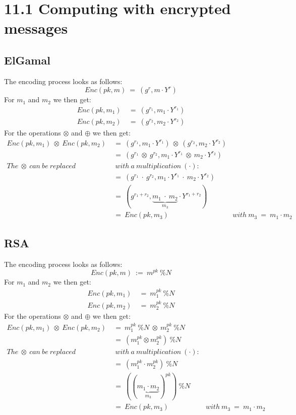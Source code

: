 \documentclass{report}
\begin{document}
	\pagestyle{fancy}
	
	\section*{11.1 Computing with encrypted messages}
	\subsection*{ElGamal}
	The encoding process looks as follows:
	\[
		Enc(pk, m) \ = \ (g^{r}, m \cdot Y^{r})
	\]
	For $m_1$ and $m_2$ we then get:
	\begin{align*}
		Enc(pk, m_1) \ & = \ (g^{r_1}, m_1 \cdot Y^{r_1}) \\
		Enc(pk, m_2) \ & = \ (g^{r_2}, m_2 \cdot Y^{r_2})
	\end{align*}
	For the operations $\otimes$ and $\oplus$ we then get:
	\begin{align*}
		Enc(pk, m_1) \ \otimes \ Enc(pk, m_2) \ & = \ (g^{r_1}, m_1 \cdot Y^{r_1}) \ \otimes \ (g^{r_2}, m_2 \cdot Y^{r_2}) \\
		& = \ (g^{r_1} \ \otimes \ g^{r_2}, m_1 \cdot Y^{r_1} \ \otimes \ m_2 \cdot Y^{r_2}) \\
		The \ \otimes \ can \ be \ replaced &\ with \ a \ multiplication \ (\cdot): \\
		& = \ (g^{r_1} \ \cdot \ g^{r_2}, m_1 \cdot Y^{r_1} \ \cdot \ m_2 \cdot Y^{r_2}) \\
		& = \ (g^{r_1 + r_2}, \underbrace{m_1 \ \cdot \ m_2}_{m_3} \cdot Y^{r_1 + r_2}) \\
		& = \ Enc(pk, m_3) & with \ m_3 \ = \ m_1 \cdot m_2
	\end{align*}
	\subsection*{RSA}
	The encoding process looks as follows:
	\[
		Enc(pk, m) \ := \ m^{pk} \ \% N
	\]
	For $m_1$ and $m_2$ we then get:
	\begin{align*}
		Enc(pk, m_1) \ & = \ m_1^{pk} \ \% N \\
		Enc(pk, m_2) \ & = \ m_2^{pk} \ \% N
	\end{align*}
	For the operations $\otimes$ and $\oplus$ we then get:
	\begin{align*}
		Enc(pk, m_1) \ \otimes \ Enc(pk, m_2) \ & = \ m_1^{pk} \ \% N \ \otimes \ m_2^{pk} \ \% N \\
		& = \ (m_1^{pk} \otimes m_2^{pk}) \ \% N \\
		The \ \otimes \ can \ be \ replaced &\ with \ a \ multiplication \ (\cdot): \\
		& = \ (m_1^{pk} \cdot m_2^{pk}) \ \% N \\
		& = \ ((\underbrace{m_1\cdot m_2}_{m_3})^{pk}) \ \% N \\
		& = \ Enc(pk, m_3) & with \ m_3 \ = \ m_1 \cdot m_2
	\end{align*}
	\newpage
\end{document}
